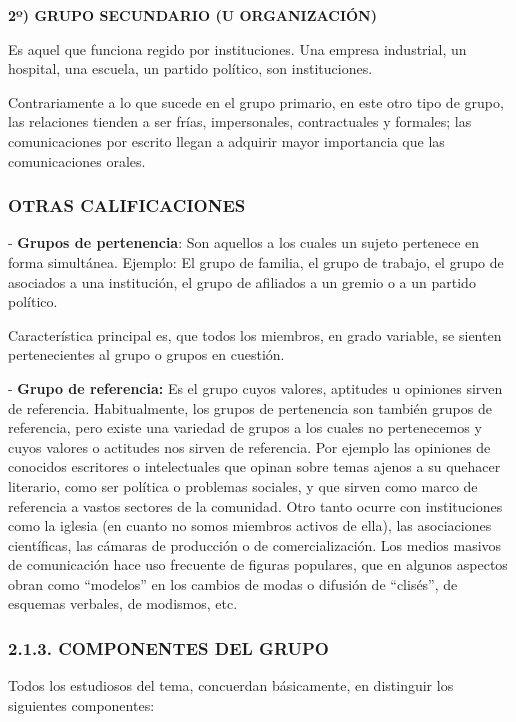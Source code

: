 \textbf{2º) GRUPO SECUNDARIO (U ORGANIZACIÓN)}

Es aquel que funciona regido por instituciones. Una empresa industrial, un hospital, una escuela, un partido político, son instituciones.

Contrariamente a lo que sucede en el grupo primario, en este otro tipo de grupo, las relaciones tienden a ser frías, impersonales, contractuales y formales; las comunicaciones por escrito llegan a adquirir mayor importancia que las comunicaciones orales.

\subsubsection*{OTRAS CALIFICACIONES}


- \textbf{Grupos de pertenencia}: Son aquellos a los cuales un sujeto pertenece en forma simultánea. Ejemplo: El grupo de familia, el grupo de trabajo, el grupo de asociados a una institución, el grupo de afiliados a un gremio o a un partido político.

Característica principal es, que todos los miembros, en grado variable, se sienten pertenecientes al grupo o grupos en cuestión.

- \textbf{Grupo de referencia: }Es el grupo cuyos valores, aptitudes u opiniones sirven de referencia. Habitualmente, los grupos de pertenencia son también grupos de referencia, pero existe una variedad de grupos a los cuales no pertenecemos y cuyos valores o actitudes nos sirven de referencia. Por ejemplo las opiniones de conocidos escritores o intelectuales que opinan sobre temas ajenos a su quehacer literario, como ser política o problemas sociales, y que sirven como marco de referencia a vastos sectores de la comunidad. Otro tanto ocurre con instituciones como la iglesia (en cuanto no somos miembros activos de ella), las asociaciones científicas, las cámaras de producción o de comercialización. Los medios masivos de comunicación hace uso frecuente de figuras populares, que en algunos aspectos obran como “modelos” en los cambios de modas o difusión de “clisés”, de esquemas verbales, de modismos, etc.

\subsubsection*{2.1.3. COMPONENTES DEL GRUPO}
Todos los estudiosos del tema, concuerdan básicamente, en distinguir los siguientes componentes:


